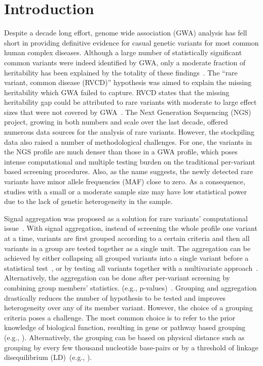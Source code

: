 \documentclass[11pt]{article}
\begin{document}
\section*{Introduction}
Despite a decade long effort, genome wide association (GWA) analysis has fell short in providing definitive evidence for casual genetic variants for most common human complex diseases. Although a large number of statistically significant common variants were indeed identified by GWA, only a moderate fraction of heritability has been explained by the totality of these findings~\citep{GWA1, GWA2}. The ``rare variant, common disease (RVCD)'' hypothesis was aimed to explain the missing heritability which GWA failed to capture. RVCD states that the missing heritability gap could be attributed to rare variants with moderate to large effect sizes that were not covered by GWA~\citep{RVCD1}. The Next Generation Sequencing (NGS) project, growing in both numbers and scale over the last decade, offered numerous data sources for the analysis of rare variants. However, the stockpiling data also raised a number of methodological challenges. For one, the variants in the NGS profile are much denser than those in a GWA profile, which poses intense computational and multiple testing burden on the traditional per-variant based screening procedures. Also, as the name suggests, the newly detected rare variants have minor allele frequencies (MAF) close to zero. As a consequence, studies with a small or a moderate sample size may have low statistical power due to the lack of genetic heterogeneity in the sample. 

Signal aggregation was proposed as a solution for rare variants' computational issue~\citep{Burden1, UST1, UST2, SKAT, GCTA, Dai:2015, plink1}. With signal aggregation, instead of screening the whole profile one variant at a time, variants are first grouped according to a certain criteria and then all variants in a group are tested together as a single unit. The aggregation can be achieved by either collapsing all grouped variants into a single variant before a statistical test~\citep{Burden1}, or by testing all variants together with a multivariate approach~\citep{UST1, UST2, SKAT, GCTA}. Alternatively, the aggregation can be done after per-variant screening by combining group members' statistics. (e.g., p-values)~\citep{Dai:2015, plink1, zaykin2002truncated}. Grouping and aggregation drastically reduces the number of hypothesis to be tested and improves heterogeneity over any of its member variant. However, the choice of a grouping criteria poses a challenge. The most common choice is to refer to the prior knowledge of biological function, resulting in gene or pathway based grouping (e.g., \cite{vsevolozhskaya2016uncovering}). Alternatively, the grouping can be based on physical distance such as grouping by every few thousand nucleotide base-pairs or by a threshold of linkage disequilibrium (LD)~(e.g., \cite{plink1}).
\end{document}
